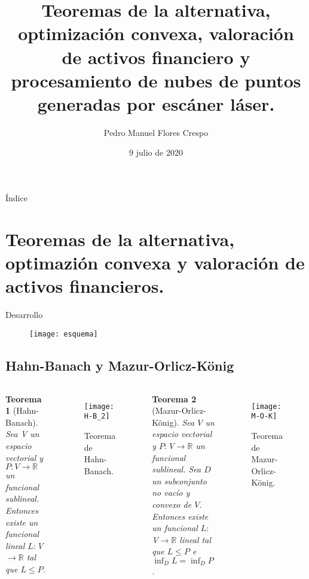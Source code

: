 \documentclass[9pt]{beamer}
\author[]{Pedro Manuel Flores Crespo}
\title[Trabajo Fin de Grado]{Teoremas de la alternativa, optimización convexa, valoración de activos financiero y procesamiento de nubes de puntos generadas por escáner láser.}
\date{9 julio de 2020}
\newtheorem{teorema}{Teorema}
\newcommand{\RR}{\mathbb{R}}
\newcommand{\vecSpace}{ $V$ }
\begin{document}
	
	\begin{frame}
		\maketitle
	\end{frame}

	\begin{frame}{Índice}
		\tableofcontents
	\end{frame}

	\section[Teoremas de la alternativa, optimazión convexa y valoración de activos financieros]{Teoremas de la alternativa, optimazión convexa y valoración de activos financieros.}

	\begin{frame}{Desarrollo}
	\begin{figure}[h!]
		\centering
		\texttt{[image: esquema]}
	\end{figure}
	\end{frame}


	\subsection{Hahn-Banach y Mazur-Orlicz-König}
		\begin{frame}[fragile]{}
			\begin{columns}
				\column{0.5\textwidth}
				\begin{teorema}[Hahn-Banach]
					Sea V un espacio vectorial y $P:V \rightarrow \RR$ un funcional sublineal. Entonces existe un funcional lineal $ L:\vecSpace \longrightarrow \RR $ tal que $ L \leq P $.
				\end{teorema}
			\begin{figure}[h!]
				\centering
				\texttt{[image: H-B\_2]}
				\caption{Teorema de Hahn-Banach.}
			\end{figure}
				\column{0.5\textwidth}
				\begin{teorema}[Mazur-Orlicz-König]
						Sea\vecSpace un espacio vectorial y $P:\vecSpace \rightarrow \RR$ un funcional sublineal.  Sea $ D $ un subconjunto no vacío y convexo de $ V $. Entonces existe un funcional $ L: \vecSpace \longrightarrow \RR $ lineal tal que $ L \leq P $ e $ \inf_D L = \inf_D P $.
				\end{teorema}
			\begin{figure}[h!]
				\centering
				\texttt{[image: M-O-K]}
				\caption{Teorema de Mazur-Orlicz-König.}
			\end{figure} 
			\end{columns}
		\end{frame}
\end{document}
